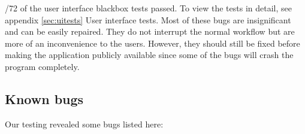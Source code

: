 \documentclass[a4paper]{report}
\begin{document}
/72 of the user interface blackbox tests passed. To view the tests in detail, see appendix \ref{sec:uitests} User interface tests. Most of these bugs are insignificant and can be easily repaired. They do not interrupt the normal workflow but are more of an inconvenience to the users. However, they should still be fixed before making the application publicly available since some of the bugs will crash the program completely.

\subsection{Known bugs}

Our testing revealed some bugs listed here: \\ \\
\end{document}
